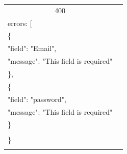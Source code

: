 \documentclass[12pt,oneside,openright,a4paper]{cpe-thai-project}
\begin{document}
\begin{longtable}[!ht]{p{3cm}|p{8cm}}
  \multicolumn{1}{c|}{400}  &
  \begin{tabular}[c]{@{}l@{}}\{\\ \quad errors: {[}\\ \quad\quad\{\\ \quad\quad\quad "field": "Email",\\ \quad\quad\quad"message": "This field is required"\\ \quad\quad\},\\ 
    \quad\quad\{\\ \quad\quad\quad"field": "password",\\ \quad\quad\quad "message": "This field is required"\\ \quad\quad \}\\\quad {]}\\ \}\end{tabular}                                                                         \\ \hline
  \hhline{==}
\end{longtable}
\end{document}
